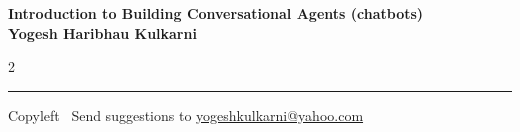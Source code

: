 \documentclass[8pt,landscape]{article}
\begin{document}
\footnotesize


\begin{center}
\Large{\textbf{Introduction to Building Conversational Agents (chatbots)\\ Yogesh Haribhau Kulkarni}}  
\end{center}

\begin{multicols}{2}

\end{multicols}

\rule{\linewidth}{0.25pt}
\scriptsize
Copyleft \textcopyleft\  Send suggestions to 
\href{http://www.yogeshkulkarni.com}{yogeshkulkarni@yahoo.com}
\end{document}
